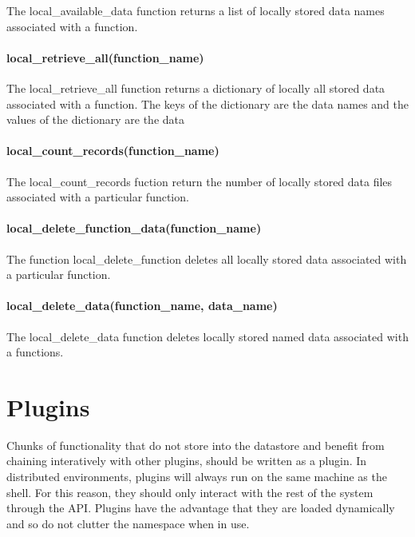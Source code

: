 \documentclass{book}
\begin{document}
The local\_available\_data function returns a list of locally stored data names associated with a function.

\subsubsection{local\_retrieve\_all(function\_name)}

The local\_retrieve\_all function returns a dictionary of locally all stored data associated with a function. The keys of the dictionary are the data names and the values of the dictionary are the data

\subsubsection{local\_count\_records(function\_name)}

The local\_count\_records fuction return the number of locally stored data files associated with a particular function.

\subsubsection{local\_delete\_function\_data(function\_name)}

The function local\_delete\_function deletes all locally stored data associated with a particular function.

\subsubsection{local\_delete\_data(function\_name, data\_name)}

The local\_delete\_data function deletes locally stored named data associated with a functions.

\chapter{Plugins}
Chunks of functionality that do not store into the datastore and benefit from chaining interatively with other plugins, should be written as a plugin.  In distributed environments, plugins will always run on the same machine as the shell.  For this reason, they should only interact with the rest of the system through the API. Plugins have the advantage that they are loaded dynamically and so do not clutter the namespace when in use.
\end{document}
